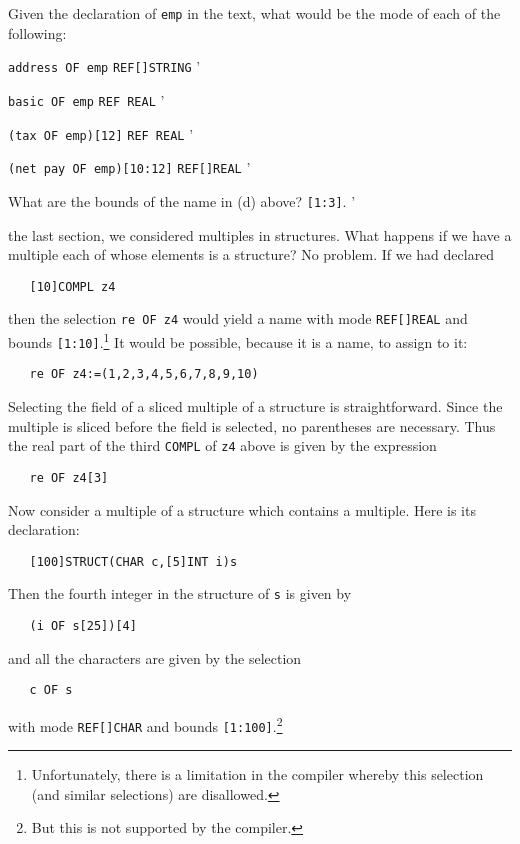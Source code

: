 \begin{exercise}
\item Given the declaration of \verb|emp| in the text, what would be
the mode of each of the following:
\begin{subex}
\item \verb|address OF emp| \subans \verb|REF[]STRING|
'
\item \verb|basic OF emp| \subans \verb|REF REAL|
'
\item \verb|(tax OF emp)[12]| \subans \verb|REF REAL|
'
\item \verb|(net pay OF emp)[10:12]| \subans \verb|REF[]REAL|
'
\end{subex}
\item What are the bounds of the name in (d) above?
\ans \verb|[1:3]|.
'
\end{exercise}

 the last section, we considered
multiples in structures.  What happens if we have a multiple each of
whose elements is a structure?  No problem.  If we had declared
\begin{verbatim}
   [10]COMPL z4
\end{verbatim}
\noindent
then the selection \verb|re OF z4| would yield a name with mode
\verb|REF[]REAL| and bounds \verb|[1:10]|.\footnote{Unfortunately,
there is a limitation in the \protect{} compiler
whereby this selection (and similar selections) are disallowed.} It
would be possible, because it is a name, to assign to it:
\begin{verbatim}
   re OF z4:=(1,2,3,4,5,6,7,8,9,10)
\end{verbatim}

Selecting the field of a sliced multiple of a structure is
straightforward. Since the multiple is sliced before the field is
selected, no parentheses are necessary. Thus the real part of the
third \verb|COMPL| of \verb|z4| above is given by the expression
\begin{verbatim}
   re OF z4[3]
\end{verbatim}

Now consider a multiple of a structure which contains a multiple. Here
is its declaration:
\begin{verbatim}
   [100]STRUCT(CHAR c,[5]INT i)s
\end{verbatim}
\noindent
Then the fourth integer in the  structure of \verb|s| is
given by
\begin{verbatim}
   (i OF s[25])[4]
\end{verbatim}
\noindent
and all the characters are given by the selection
\begin{verbatim}
   c OF s
\end{verbatim}
\noindent
with mode \verb|REF[]CHAR| and bounds \verb|[1:100]|.\footnote{But
this is not supported by the \protect{} compiler.}

